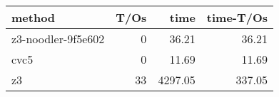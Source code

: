 \begin{tabular}{lrrr}
\hline
 method             &   T/Os &    time &   time-T/Os \\
\hline
 z3-noodler-9f5e602 &      0 &   36.21 &       36.21 \\
 cvc5               &      0 &   11.69 &       11.69 \\
 z3                 &     33 & 4297.05 &      337.05 \\
\hline
\end{tabular}
